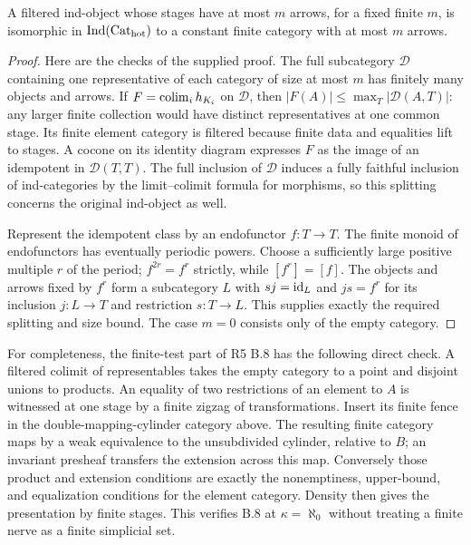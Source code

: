 \begin{proposition}
\label{CD:uniformfinite}
A filtered ind-object whose stages have at most $m$ arrows, for a fixed
finite $m$, is isomorphic in $\operatorname{Ind}(\mathrm{Cat}_{\mathrm{hot}})$ to a
constant finite category with at most $m$ arrows.
\end{proposition}
\begin{proof}
Here are the checks of the supplied proof.  The full subcategory
$\mathcal D$ containing one representative of each category of size at
most $m$ has finitely many objects and arrows.  If
$F=\operatorname{colim}_i h_{K_i}$ on $\mathcal D$, then
$|F(A)|\le\max_T|\mathcal D(A,T)|$: any larger finite collection would
have distinct representatives at one common stage.  Its finite element
category is filtered because finite data and equalities lift to stages.
A cocone on its identity diagram expresses $F$ as the image of an
idempotent in $\mathcal D(T,T)$.  The full inclusion of $\mathcal D$
induces a fully faithful inclusion of ind-categories by the
limit--colimit formula for morphisms, so this splitting concerns the
original ind-object as well.

Represent the idempotent class by an endofunctor $f:T\to T$.
The finite monoid of endofunctors has eventually periodic powers.
Choose a sufficiently large positive multiple $r$ of the period;
$f^{2r}=f^r$ strictly, while $[f^r]=[f]$.  The objects and arrows fixed
by $f^r$ form a subcategory $L$ with $sj=\mathrm{id}_L$ and $js=f^r$ for its
inclusion $j:L\to T$ and restriction $s:T\to L$.
This supplies exactly the required splitting and size bound.  The case
$m=0$ consists only of the empty category.
\end{proof}

For completeness, the finite-test part of R5 B.8 has the following
direct check.  A filtered colimit of representables takes the empty
category to a point and disjoint unions to products.  An equality of
two restrictions of an element to $A$ is witnessed at one stage by a
finite zigzag of transformations.  Insert its finite fence in the
double-mapping-cylinder category above.  The resulting finite category
maps by a weak equivalence to the unsubdivided cylinder, relative to
$B$; an invariant presheaf transfers the extension across this map.
Conversely those product and extension conditions are exactly the
nonemptiness, upper-bound, and equalization conditions for the element
category.  Density then gives the presentation by finite stages.
This verifies B.8 at $\kappa=\aleph_0$ without treating a finite nerve
as a finite simplicial set.


